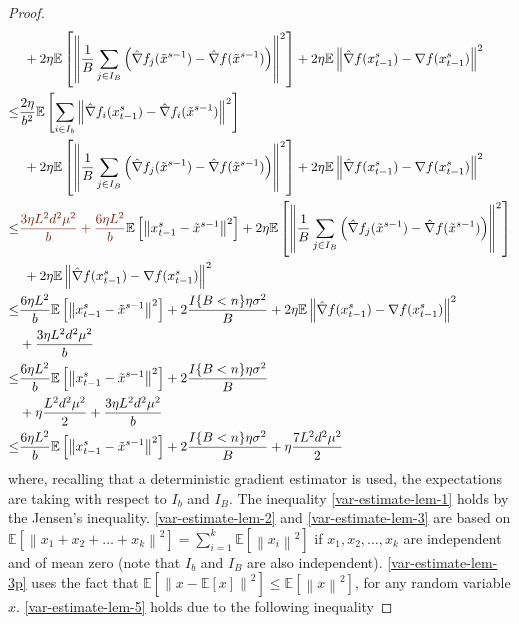 \documentclass{article}
\newcommand*{\E}{\mathbb{E}}
\newcommand{\norm}[1]{\left\lVert#1\right\rVert}
\theoremstyle{definition}
\theoremstyle{remark}
\begin{document}
\begin{proof}
\begin{align}
   &\,\, \label{var-estimate-lem-3}+ 2\eta \E \left[ \norm{\frac{1}{B}\sum_{j\in I_B}\left(\hat{\nabla} f_j(\tilde{x}^{s-1}) - \hat{\nabla} f(\tilde{x}^{s-1})\right)}^2\right]+2\eta \E \norm{\hat{\nabla} f(x_{t-1}^s)-\nabla f(x_{t-1}^s)}^2\\
   \leq &\notag\frac{2\eta}{b^2}\E\left[\sum_{i\in I_b}\norm{\hat{\nabla} f_i(x_{t-1}^s)-\hat{\nabla} f_i(\tilde{x}^{s-1}) }^2\right]\\
   &\,\, \label{var-estimate-lem-3p}+ 2\eta \E \left[ \norm{\frac{1}{B}\sum_{j\in I_B}\left(\hat{\nabla} f_j(\tilde{x}^{s-1}) - \hat{\nabla} f(\tilde{x}^{s-1})\right)}^2\right]+2\eta \E \norm{\hat{\nabla} f(x_{t-1}^s)-\nabla f(x_{t-1}^s)}^2\\
   \leq  &{\color{Brown}\frac{3 \eta L^2 d^2 \mu^2}{b} + \frac{6\eta L^2}{b}}\E\left[\norm{x_{t-1}^s-\tilde{x}^{s-1}}^2\right]+ 2\eta \E \left[ \norm{\frac{1}{B}\sum_{j\in I_B}\left(\hat{\nabla} f_j(\tilde{x}^{s-1}) - \hat{\nabla} f(\tilde{x}^{s-1})\right)}^2\right]\notag\\
   &\,\,\label{var-estimate-lem-5}+2\eta \E \norm{\hat{\nabla} f(x_{t-1}^s)-\nabla f(x_{t-1}^s)}^2\\
   \leq  &\frac{6\eta L^2}{b}\E\left[\norm{x_{t-1}^s-\tilde{x}^{s-1}}^2\right]+ 2\frac{I\{B < n\}\eta \sigma ^2}{B}+2\eta \E \norm{\hat{\nabla} f(x_{t-1}^s)-\nabla f(x_{t-1}^s)}^2\notag\\
   & \label{var-estimate-lem-6}+ \frac{3 \eta L^2 d^2 \mu^2}{b}\\
   \leq  &\label{var-estimate-lem-6}\frac{6\eta L^2}{b}\E\left[\norm{x_{t-1}^s-\tilde{x}^{s-1}}^2\right]+ 2\frac{I\{B < n\}\eta \sigma ^2}{B}\notag\\
   & +\eta \frac{L^2d^2\mu^2}{2}+ \frac{3 \eta L^2 d^2 \mu^2}{b}\\
   \leq  &\label{var-estimate-lem-7}\frac{6\eta L^2}{b}\E\left[\norm{x_{t-1}^s-\tilde{x}^{s-1}}^2\right]+ 2\frac{I\{B < n\}\eta \sigma ^2}{B}+\eta \frac{7L^2 d^2 \mu^2}{2} 
 \end{align}
 where, recalling that a deterministic gradient estimator is used, the expectations are taking with respect to $I_b$ and $I_B$. The inequality \eqref{var-estimate-lem-1} holds by the Jensen’s inequality. \eqref{var-estimate-lem-2} and \eqref{var-estimate-lem-3} are based on $\E[\norm{x_1+x_2+\ldots+x_k}^2] = \sum_{i=1}^k \E[\norm{x_i}^2]$ if $x_1,x_2,\ldots,x_k$ are independent and of mean zero (note that $I_b$ and $I_B$ are also independent). \eqref{var-estimate-lem-3p} uses the fact that $\E[\norm{x-\E[x]}^2] \leq \E[\norm{x}^2]$, for any random variable $x$. \eqref{var-estimate-lem-5} holds due to the following inequality  

\end{proof}
\end{document}
